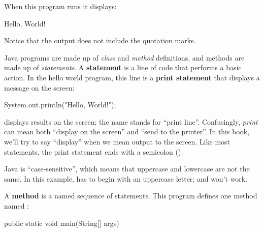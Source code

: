 When this program runs it displays:

\begin{stdout}
Hello, World!
\end{stdout}

Notice that the output does not include the quotation marks.




Java programs are made up of {\em class} and {\em method} definitions, and methods are made up of {\em statements}.
A {\bf statement} is a line of code that performs a basic action.
In the hello world program, this line is a {\bf print statement} that displays a message on the screen:

\begin{code}
System.out.println("Hello, World!");
\end{code}


 displays results on the screen; the name  stands for ``print line''.
Confusingly, {\em print} can mean both ``display on the screen'' and ``send to the printer''.
In this book, we'll try to say ``display'' when we mean output to the screen.
Like most statements, the print statement ends with a semicolon (\java{;}).


Java is ``case-sensitive'', which means that uppercase and lowercase are not the same.
In this example,  has to begin with an uppercase letter;  and  won't work.


A {\bf method} is a named sequence of statements.
This program defines one method named :

\begin{code}
public static void main(String[] args)
\end{code}

